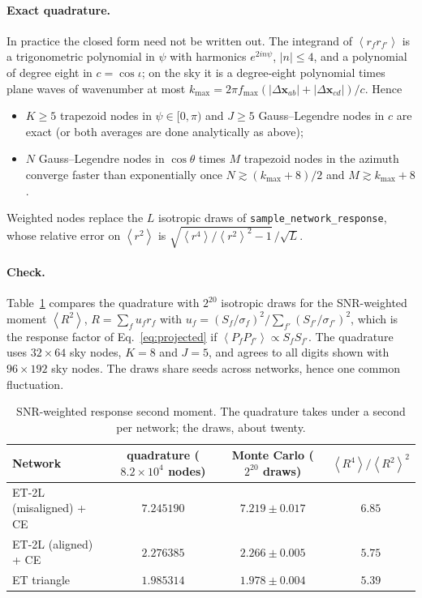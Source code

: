 \documentclass[11pt]{article}
\newcommand{\avg}[1]{\left\langle #1 \right\rangle}
\theoremstyle{remark}
\begin{document}
\paragraph{Exact quadrature.}
In practice the closed form need not be written out. The integrand of
$\avg{r_f r_{f'}}$ is a trigonometric polynomial in $\psi$ with harmonics
$e^{2in\psi}$, $|n|\le 4$, and a polynomial of degree eight in $c=\cos\iota$;
on the sky it is a degree-eight polynomial times plane waves of wavenumber at
most $k_{\max} = 2\pi f_{\max}(|\Delta\bm x_{ab}| + |\Delta\bm x_{cd}|)/c$.
Hence
\begin{itemize}
  \item $K \ge 5$ trapezoid nodes in $\psi\in[0,\pi)$ and $J \ge 5$
        Gauss--Legendre nodes in $c$ are exact (or both averages are done
        analytically as above);
  \item $N$ Gauss--Legendre nodes in $\cos\theta$ times $M$ trapezoid nodes in
        the azimuth converge faster than exponentially once
        $N \gtrsim (k_{\max} + 8)/2$ and $M \gtrsim k_{\max} + 8$.
\end{itemize}
Weighted nodes replace the $L$ isotropic draws of
\texttt{sample\_network\_response}, whose relative error on $\avg{r^2}$ is
$\sqrt{\avg{r^4}/\avg{r^2}^2 - 1}\,/\sqrt{L}$.

\paragraph{Check.}
Table~\ref{tab:check} compares the quadrature with $2^{20}$ isotropic draws for
the SNR-weighted moment $\avg{R^2}$, $R = \sum_f u_f r_f$ with
$u_f = (S_f/\sigma_f)^2/\sum_{f'}(S_{f'}/\sigma_{f'})^2$, which is the
response factor of Eq.~\eqref{eq:projected} if
$\avg{P_fP_{f'}}\propto S_fS_{f'}$. The quadrature uses
$32\times64$ sky nodes, $K = 8$ and $J = 5$, and agrees to all digits shown with
$96\times192$ sky nodes. The draws share seeds across networks, hence one common
fluctuation.

\begin{table}[H]
  \centering
  \small
  \begin{tabular}{lccc}
    \toprule
    Network & quadrature ($8.2\times10^4$ nodes) & Monte Carlo ($2^{20}$ draws)
            & $\avg{R^4}/\avg{R^2}^2$ \\
    \midrule
    ET-2L (misaligned) + CE & $7.245190$ & $7.219 \pm 0.017$ & $6.85$ \\
    ET-2L (aligned) + CE    & $2.276385$ & $2.266 \pm 0.005$ & $5.75$ \\
    ET triangle             & $1.985314$ & $1.978 \pm 0.004$ & $5.39$ \\
    \bottomrule
  \end{tabular}
  \caption{SNR-weighted response second moment. The quadrature takes under a
  second per network; the draws, about twenty.}
  \label{tab:check}
\end{table}
\end{document}
